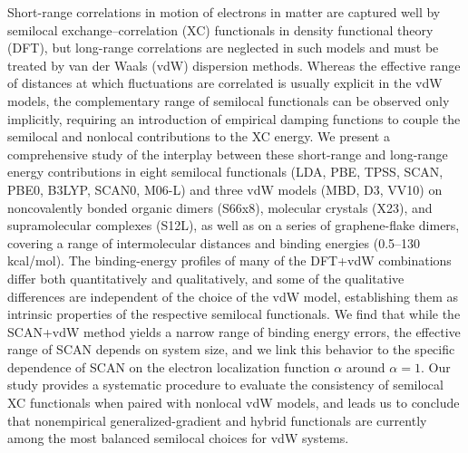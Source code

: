 Short-range correlations in motion of electrons in matter are captured well by semilocal exchange--correlation (XC) functionals in density functional theory (DFT), but long-range correlations are neglected in such models and must be treated by van der Waals (vdW) dispersion methods.
Whereas the effective range of distances at which fluctuations are correlated is usually explicit in the vdW models, the complementary range of semilocal functionals can be observed only implicitly, requiring an introduction of empirical damping functions to couple the semilocal and nonlocal contributions to the XC energy.
We present a comprehensive study of the interplay between these short-range and long-range energy contributions in eight semilocal functionals (LDA, PBE, TPSS, SCAN, PBE0, B3LYP, SCAN0, M06-L) and three vdW models (MBD, D3, VV10) on noncovalently bonded organic dimers (S66x8), molecular crystals (X23), and supramolecular complexes (S12L), as well as on a series of graphene-flake dimers, covering a range of intermolecular distances and binding energies (0.5--130\,kcal/mol).
The binding-energy profiles of many of the DFT+vdW combinations differ both quantitatively and qualitatively, and some of the qualitative differences are independent of the choice of the vdW model, establishing them as intrinsic properties of the respective semilocal functionals.
We find that while the SCAN+vdW method yields a narrow range of binding energy errors, the effective range of SCAN depends on system size, and we link this behavior to the specific dependence of SCAN on the electron localization function $\alpha$ around $\alpha=1$.
Our study provides a systematic procedure to evaluate the consistency of semilocal XC functionals when paired with nonlocal vdW models, and leads us to conclude that nonempirical generalized-gradient and hybrid functionals are currently among the most balanced semilocal choices for vdW systems.
